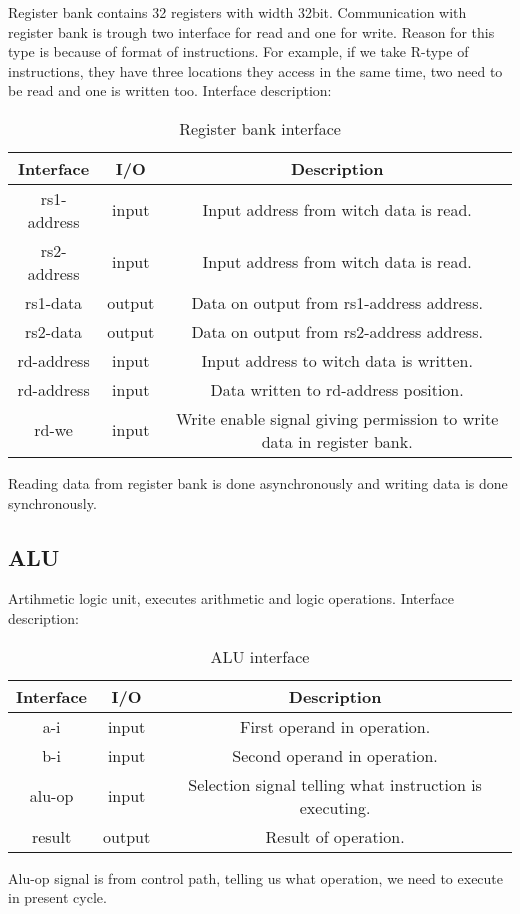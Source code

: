 \documentclass{scrreprt}
\begin{document}
Register bank contains 32 registers with width 32bit. Communication with register bank is trough two interface for read and one for write. Reason for this type is because of format of instructions. For example, if we take R-type of instructions, they have three locations they access in the same time, two need to be read and one is written too. 
Interface description: 
    \begin{table}[ht]
        \centering
        \begin{tabular}{|c|c|c|} \hline 
             Interface & I/O & Description \\ \hline  
             rs1-address & input & Input address from witch data is read. \\ \hline  
             rs2-address & input & Input address from witch data is read.  \\ \hline
             rs1-data & output & Data on output from rs1-address address. \\ \hline
             rs2-data & output & Data on output from rs2-address address. \\ \hline
             rd-address & input & Input address to witch data is written.  \\ \hline
             rd-address & input & Data written to rd-address position.  \\ \hline
             rd-we & input & Write enable signal giving permission to write data in register bank.  \\ \hline
        \end{tabular}
        \caption{Register bank interface}
        \label{tab:Reg interface}
    \end{table}
    \hfill \break
Reading data from register bank is done asynchronously and writing data is done synchronously. 
\subsection*{ALU}
Artihmetic logic unit, executes arithmetic and logic operations. Interface description:
\begin{table}[ht]
        \centering
        \begin{tabular}{|c|c|c|} \hline 
             Interface & I/O & Description \\ \hline  
             a-i & input & First operand in operation. \\ \hline  
             b-i & input & Second operand in operation.  \\ \hline
             alu-op & input & Selection signal telling what instruction is executing. \\ \hline
             result & output & Result of operation. \\ \hline
        \end{tabular}
        \caption{ALU interface}
        \label{tab:ALU interface}
    \end{table}
    \hfill \break
Alu-op signal is from control path, telling us what operation, we need to execute in present cycle. 
\end{document}
